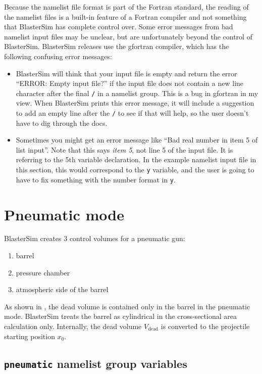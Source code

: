 Because the namelist file format is part of the Fortran standard, the reading of the namelist files is a built-in feature of a Fortran compiler and not something that BlasterSim has complete control over.
Some error messages from bad namelist input files may be unclear, but are unfortunately beyond the control of BlasterSim.
BlasterSim releases use the gfortran compiler, which has the following confusing error messages:
\begin{itemize}
\item BlasterSim will think that your input file is empty and return the error ``ERROR: Empty input file?'' if the input file does not contain a new line character after the final \texttt{/} in a namelist group. %
This is a bug in gfortran in my view.
When BlasterSim prints this error message, it will include a suggestion to add an empty line after the \texttt{/} to see if that will help, so the user doesn't have to dig through the docs.
\item Sometimes you might get an error message like ``Bad real number in item 5 of list input''.
Note that this says \textit{item 5}, not line 5 of the input file.
It is referring to the 5th variable declaration.
In the example namelist input file in this section, this would correspond to the \texttt{y} variable, and the user is going to have to fix something with the number format in \texttt{y}.
\end{itemize}

\section{Pneumatic mode}\label{pneumatic}

BlasterSim creates 3 control volumes for a pneumatic gun:
\begin{enumerate}
\item barrel
\item pressure chamber
\item atmospheric side of the barrel
\end{enumerate}

As shown in , the dead volume is contained only in the barrel in the pneumatic mode.
BlasterSim treats the barrel as cylindrical in the cross-sectional area calculation only.
Internally, the dead volume $V_\text{dead}$ is converted to the projectile starting position $x_0$.



\subsection{\texttt{pneumatic} namelist group variables}\label{pneumatic-namelist}

